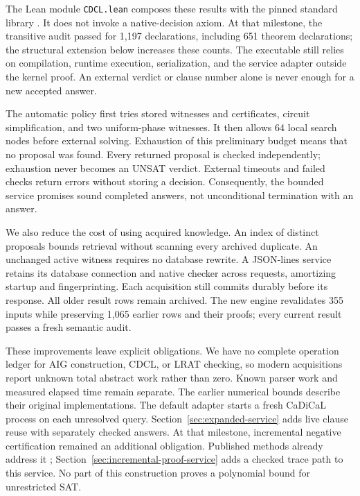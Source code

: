 \documentclass[11pt,a4paper]{article}
\numberwithin{equation}{section}
\theoremstyle{plain}
\theoremstyle{definition}
\theoremstyle{remark}
\begin{document}
The Lean module \texttt{CDCL.lean} composes these results with the pinned standard library \citep{lean2025sat}. It does not invoke a native-decision axiom. At that milestone, the transitive audit passed for 1,197 declarations, including 651 theorem declarations; the structural extension below increases these counts. The executable still relies on compilation, runtime execution, serialization, and the service adapter outside the kernel proof. An external verdict or clause number alone is never enough for a new accepted answer.

The automatic policy first tries stored witnesses and certificates, circuit simplification, and two uniform-phase witnesses. It then allows 64 local search nodes before external solving. Exhaustion of this preliminary budget means that no proposal was found. Every returned proposal is checked independently; exhaustion never becomes an UNSAT verdict. External timeouts and failed checks return errors without storing a decision. Consequently, the bounded service promises sound completed answers, not unconditional termination with an answer.

We also reduce the cost of using acquired knowledge. An index of distinct proposals bounds retrieval without scanning every archived duplicate. An unchanged active witness requires no database rewrite. A JSON-lines service retains its database connection and native checker across requests, amortizing startup and fingerprinting. Each acquisition still commits durably before its response. All older result rows remain archived. The new engine revalidates 355 inputs while preserving 1,065 earlier rows and their proofs; every current result passes a fresh semantic audit.

These improvements leave explicit obligations. We have no complete operation ledger for AIG construction, CDCL, or LRAT checking, so modern acquisitions report unknown total abstract work rather than zero. Known parser work and measured elapsed time remain separate. The earlier numerical bounds describe their original implementations. The default adapter starts a fresh CaDiCaL process on each unresolved query. Section~\ref{sec:expanded-service} adds live clause reuse with separately checked answers. At that milestone, incremental negative certification remained an additional obligation. Published methods already address it \citep{fazekas2024incremental}; Section~\ref{sec:incremental-proof-service} adds a checked trace path to this service. No part of this construction proves a polynomial bound for unrestricted SAT.
\end{document}
